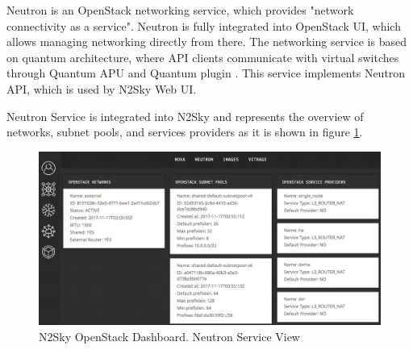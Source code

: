 Neutron is an OpenStack networking service, which provides "network connectivity as a service". Neutron is fully integrated into OpenStack UI, which allows managing networking directly from there. The networking service is based on quantum architecture, where API clients communicate with virtual switches through Quantum APU and Quantum plugin \cite{neutron}. This service implements Neutron API, which is used by N2Sky Web UI. 

Neutron Service is integrated into N2Sky and represents the overview of networks, subnet pools, and services providers as it is shown in figure \ref{fig:openstack_neutron}.

\begin{figure}[H]
\begin{center}
  \includegraphics[width=\linewidth]{components/4/pics/openstack_neutron.png}
  \caption{N2Sky OpenStack Dashboard. Neutron Service View}
  \label{fig:openstack_neutron}
\end{center}
\end{figure}


